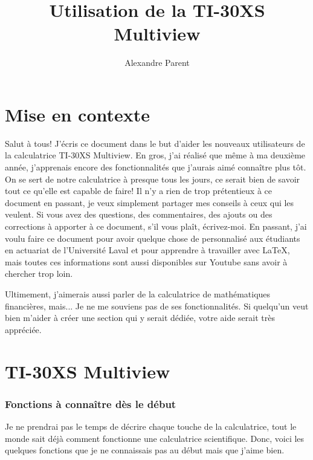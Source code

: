 \documentclass[french]{article}
\title{Utilisation de la TI-30XS Multiview}
\author{Alexandre Parent}
\begin{document}
\maketitle

\tableofcontents

\setlength{\parskip}{1.8ex}

\pagebreak

\part*{Mise en contexte}
Salut à tous! J'écris ce document dans le but d'aider les nouveaux utilisateurs de la calculatrice TI-30XS Multiview. En gros, j'ai réalisé que même à ma deuxième année, j'apprenais encore des fonctionnalités que j'aurais aimé connaître plus tôt. On se sert de notre calculatrice à presque tous les jours, ce serait bien de savoir tout ce qu'elle est capable de faire! Il n'y a rien de trop prétentieux à ce document en passant, je veux simplement partager mes conseils à ceux qui les veulent. Si vous avez des questions, des commentaires, des ajouts ou des corrections à apporter à ce document, s'il vous plaît, écrivez-moi. En passant, j'ai voulu faire ce document pour avoir quelque chose de personnalisé aux étudiants en actuariat de l'Université Laval et pour apprendre à travailler avec LaTeX, mais toutes ces informations sont aussi disponibles sur Youtube sans avoir à chercher trop loin.

Ultimement, j'aimerais aussi parler de la calculatrice de mathématiques financières, mais... Je ne me souviens pas de ses fonctionnalités. Si quelqu'un veut bien m'aider à créer une section qui y serait dédiée, votre aide serait très appréciée.

\pagebreak

\part{TI-30XS Multiview} 

\section{Fonctions à connaître dès le début}
\label{sec:fonctiondebut}

Je ne prendrai pas le temps de décrire chaque touche de la calculatrice, tout le monde sait déjà comment fonctionne une calculatrice scientifique. Donc, voici les quelques fonctions que je ne connaissais pas au début mais que j'aime bien.
\end{document}
